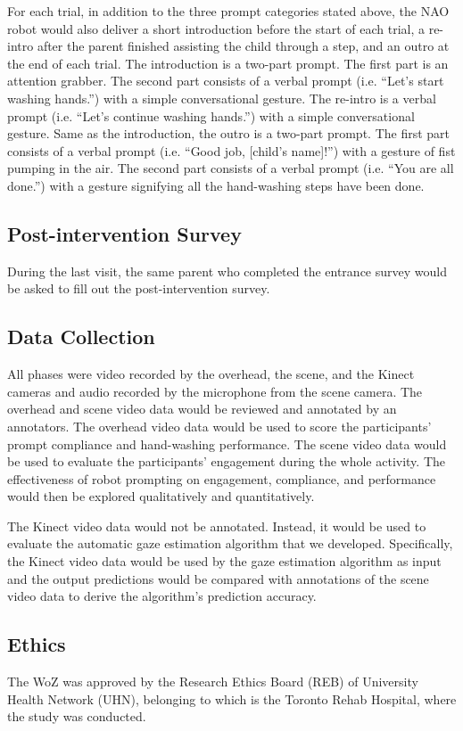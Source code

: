 For each trial, in addition to the three prompt categories stated above, the NAO robot would also deliver a short introduction before the start of each trial, a re-intro after the parent finished assisting the child through a step, and an outro at the end of each trial. The introduction is a two-part prompt. The first part is an attention grabber. The second part consists of a verbal prompt (i.e. “Let's start washing hands.”) with a simple conversational gesture. The re-intro is a verbal prompt (i.e. “Let's continue washing hands.”) with a simple conversational gesture. Same as the introduction, the outro is a two-part prompt. The first part consists of a verbal prompt (i.e. “Good job, [child's name]!”) with a gesture of fist pumping in the air. The second part consists of a verbal prompt (i.e. “You are all done.”) with a gesture signifying all the hand-washing steps have been done.

\subsection{Post-intervention Survey}
During the last visit, the same parent who completed the entrance survey would be asked to fill out the post-intervention survey.

\subsection{Data Collection}
All phases were video recorded by the overhead, the scene, and the Kinect cameras and audio recorded by the microphone from the scene camera.  The overhead and scene video data would be reviewed and annotated by an annotators. The overhead video data would be used to score the participants' prompt compliance and hand-washing performance. The scene video data would be used to evaluate the participants' engagement during the whole activity. The effectiveness of robot prompting on engagement, compliance, and performance would then be explored qualitatively and quantitatively.

The Kinect video data would not be annotated. Instead, it would be used to evaluate the automatic gaze estimation algorithm that we developed. Specifically, the Kinect video data would be used by the gaze estimation algorithm as input and the output predictions would be compared with annotations of the scene video data to derive the algorithm's prediction accuracy.



\subsection{Ethics}
The WoZ was approved by the Research Ethics Board (REB) of University Health Network (UHN), belonging to which is the Toronto Rehab Hospital, where the study was conducted.

